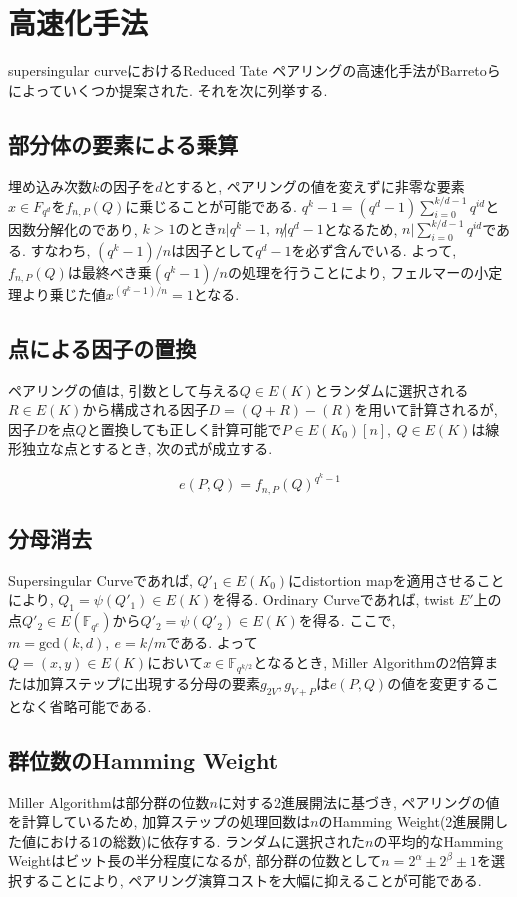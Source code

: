 \section{高速化手法}
supersingular curveにおけるReduced Tate ペアリングの高速化手法がBarretoらによっていくつか提案された\cite{BKLS01}. それを次に列挙する.
\subsection{部分体の要素による乗算}
埋め込み次数$k$の因子を$d$とすると, ペアリングの値を変えずに非零な要素$x \in {F}_{q^d}をf_{n,P}(Q)$に乗じることが可能である. $q^k - 1 = (q^d - 1)\sum^{k / d - 1}_{i = 0} q^{id}$と因数分解化のであり, $k > 1のときn | q^k -  1,\ n \not | q^d - 1$となるため, $n | \sum^{k / d - 1}_{i = 0} q^{id}$である. すなわち, $(q^k - 1) / n は因子としてq^d - 1$を必ず含んでいる. よって, $f_{n,P}(Q)は最終べき乗(q^k - 1) / n$の処理を行うことにより, フェルマーの小定理より乗じた値$x^{(q^k - 1) / n} = 1$となる.
\subsection{点による因子の置換}
ペアリングの値は, 引数として与える$Q \in E(K)$とランダムに選択される$R \in E(K)$から構成される因子$D = (Q + R) - (R)$を用いて計算されるが, 因子$Dを点Q$と置換しても正しく計算可能で$P \in E(K_0)[n],\ Q \in E(K)$は線形独立な点とするとき, 次の式が成立する.
\par
\[
e(P,Q) = f_{n,P}(Q)^{q^k-1}
\]
\subsection{分母消去}
Supersingular Curveであれば, $Q'_1 \in E(K_0)$にdistortion mapを適用させることにより, $Q_1 = \psi (Q'_1) \in E(K)$を得る. Ordinary Curveであれば, twist $E'$上の点$Q'_2 \in E(\mathbb{F}_{q^e})からQ'_2 = \psi (Q'_2) \in E(K)を得る$. ここで, $m = \mbox{gcd}(k,d),\ e = k/m$である. よって$Q = (x,y) \in E(K)においてx \in \mathbb{F}_{q^{k/2}} となるとき$, Miller Algorithmの2倍算または加算ステップに出現する分母の要素$g_{2V},g_{V + P}はe(P,Q)$の値を変更することなく省略可能である.
\subsection{群位数のHamming Weight}
Miller Algorithmは部分群の位数$n$に対する2進展開法に基づき, ペアリングの値を計算しているため, 加算ステップの処理回数は$n$のHamming Weight(2進展開した値における1の総数)に依存する. ランダムに選択された$n$の平均的なHamming Weightはビット長の半分程度になるが, 部分群の位数として$n = 2^\alpha \pm 2^\beta \pm 1$を選択することにより, ペアリング演算コストを大幅に抑えることが可能である.
